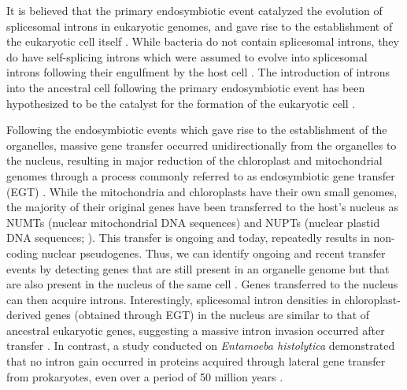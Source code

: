 \documentclass[a4paper,12pt]{article}
\begin{document}
\begin{multicols}{2}
It is believed that the primary endosymbiotic event catalyzed the evolution of
splicesomal introns in eukaryotic genomes, and gave rise to
the establishment of the eukaryotic cell itself \citep{Ahma:10}. While
bacteria do not contain splicesomal introns, they do have
self-splicing introns which were assumed to evolve into
splicesomal introns following their engulfment by the host cell \citep{Ahma:10}.
The introduction of introns into the ancestral cell
following the primary endosymbiotic event has been hypothesized to be the
catalyst for the formation of the eukaryotic cell \citep{Mart:15}.


Following the endosymbiotic events which gave rise to the establishment
of the organelles, massive gene transfer occurred unidirectionally
from the organelles to the nucleus, resulting in major reduction of
the chloroplast and mitochondrial genomes through a process commonly
referred to as endosymbiotic gene transfer (EGT) \citep{TimmisEtAl2004}.
While the mitochondria and chloroplasts have their own small genomes,
the majority of their original genes have been transferred to the
host's nucleus as NUMTs (nuclear mitochondrial DNA sequences) and NUPTs
(nuclear plastid DNA sequences; \cite{TimmisEtAl2004}).  This transfer is
ongoing and today, repeatedly results in non-coding nuclear pseudogenes.
Thus, we can identify ongoing and recent transfer events by detecting
genes that are still present in an organelle genome but that are also
present in the nucleus of the same cell \citep{Martin2003}.  Genes
transferred to the nucleus can then acquire introns.  Interestingly,
splicesomal intron densities in chloroplast-derived genes (obtained
through EGT) in the nucleus are similar to that of ancestral eukaryotic
genes, suggesting a massive intron invasion occurred after transfer
\citep{Basu:08}. In contrast, a study conducted on \textit{Entamoeba
histolytica} demonstrated that no intron gain occurred in proteins
acquired through lateral gene transfer from prokaryotes, even over a
period of 50 million years \citep{Roy:06}.



\end{multicols}
\end{document}
